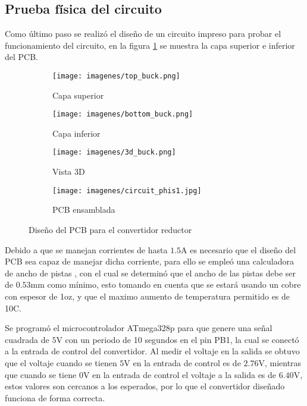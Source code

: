                                                                 
\subsection{Prueba física del circuito}

Como último paso se realizó el diseño de un circuito impreso para probar el 
funcionamiento del circuito, en la figura \ref{fig:buck_pcb} se muestra la capa
superior e inferior del PCB.

\begin{figure}[H]
    \centering
    \begin{subfigure}{0.45\linewidth}
        \centering
        \texttt{[image: imagenes/top\_buck.png]}
        \caption{Capa superior}
    \end{subfigure}
    \begin{subfigure}{0.45\linewidth}
        \centering
        \texttt{[image: imagenes/bottom\_buck.png]}
        \caption{Capa inferior}
    \end{subfigure}
    \vfill
    \begin{subfigure}{0.45\linewidth}
        \centering
        \texttt{[image: imagenes/3d\_buck.png]}
        \caption{Vista 3D}
    \end{subfigure}
    \begin{subfigure}{0.45\linewidth}
        \centering
        \texttt{[image: imagenes/circuit\_phis1.jpg]}
        \caption{PCB ensamblada}
    \end{subfigure}
    \caption{Diseño del PCB para el convertidor reductor}
    \label{fig:buck_pcb}
\end{figure}

Debido a que se manejan corrientes de hasta $1.5\text{A}$ es necesario que el
diseño del PCB sea capaz de manejar dicha corriente, para ello se empleó una 
calculadora de ancho de pistas \cite{noauthor_pcb_nodate}, con el cual se 
determinó que el ancho de las pistas debe ser de $0.53\text{mm}$ como mínimo,
esto tomando en cuenta que se estará usando un cobre con espesor de 1oz, y que
el maximo aumento de temperatura permitido es de 10\textordmasculine C. 

Se programó el microcontrolador ATmega328p para que genere una señal 
cuadrada de $5\text{V}$ con un periodo de 10 segundos en el pin PB1,
la cual se conectó a la entrada de control del convertidor. Al medir el voltaje
en la salida se obtuvo que el voltaje cuando se tienen $5\text{V}$ en la entrada
de control es de $2.76\text{V}$, mientras que cuando se tiene $0\text{V}$
en la entrada de control el voltaje a la salida es de $6.40\text{V}$, estos 
valores son cercanos a los esperados, por lo que el convertidor diseñado
funciona de forma correcta.

